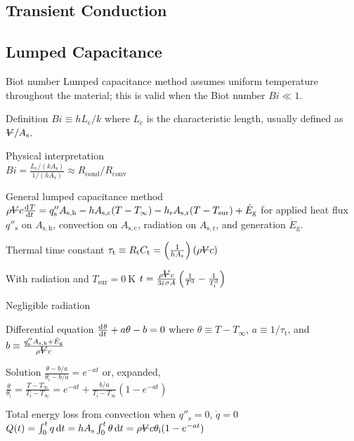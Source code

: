 \documentclass{article}
\begin{document}
\begin{multicols}{2}
\section{Transient Conduction}

\subsection{Lumped Capacitance}
\begin{description*}
\item[Biot number] Lumped capacitance method assumes uniform temperature throughout the material;
  this is valid when the Biot number \(\mathit{Bi} \ll 1\).
  \begin{description*}
  \item[Definition]
    \(\mathit{Bi} \equiv hL_\mathrm{c}/k\) where \(L_\mathrm{c}\) is the characteristic length,
    usually defined as \(\volsym / A_\mathrm{s}\).
  \item[Physical interpretation]~\\
    \(\mathit{Bi} = \frac{L_\mathrm{c}/(kA_\mathrm{s})}{1/(hA_\mathrm{s})}
    \approx R_\mathrm{cond}/R_\mathrm{conv}\)
  \end{description*}
\item[General lumped capacitance method]
  \(\rho \volsym c \od{T}{t} \\
  = q''_\mathrm{s}A_\mathrm{s,h} - hA_\mathrm{s,c}(T-T_\infty)
  - h_\mathrm{r}A_\mathrm{s,r}(T-T_\mathrm{sur}) + \dot{E}_\mathrm{g}\)
  for applied heat flux \(q''_\mathrm{s}\) on \(A_\mathrm{s,h}\), convection on \(A_\mathrm{s,c}\),
  radiation on \(A_\mathrm{s,r}\), and generation \(\dot{E}_\mathrm{g}\).
\item[Thermal time constant]
  \(\tau_\mathrm{t} \equiv R_\mathrm{t}C_\mathrm{t}
  = \left(\frac{1}{hA_\mathrm{s}}\right)(\rho\volsym{}c)\)
\item[With radiation and \(T_\mathrm{sur}=\SI{0}{\kelvin}\)]
  \(t = \frac{\rho\volsym{}c}{3\varepsilon\sigma A}\left(\frac{1}{T^3}-\frac{1}{T_\mathrm{i}^3}\right)\)
\item[Negligible radiation]~
  \begin{description*}
  \item[Differential equation]
    \(\od{\theta}{t} + a\theta - b = 0\) where
    \(\theta \equiv T-T_\infty\),
    \(a \equiv 1/\tau_\mathrm{t}\), and
    \(b \equiv \frac{q''_\mathrm{s}A_\mathrm{s,h}+\dot{E}_\mathrm{g}}{\rho\volsym{}c}\)
  \item[Solution]
    \(\frac{\theta-b/a}{\theta_\mathrm{i}-b/a} = e^{-at}\) or, expanded, \\
    \(\frac{\theta}{\theta_\mathrm{i}} = \frac{T-T_\infty}{T_\mathrm{i}-T_\infty}
    = e^{-at} + \frac{b/a}{T_\mathrm{i}-T_\infty}\left(1-e^{-at}\right)\)
  \item[Total energy loss from convection when $q''_\mathrm{s}=0$, $\dot{q}=0$]
    \(Q(t) = \int_0^tq\dif{t}
    = hA_\mathrm{s}\int_0^t\theta\dif{t} \\
    = \rho\volsym{}c\theta_\mathrm{i}(1-e^{-at})\)
  \end{description*}
\end{description*}


\end{multicols}
\end{document}
